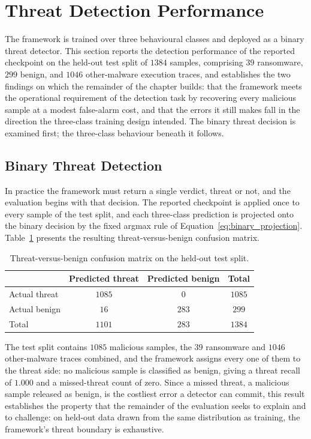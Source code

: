 \documentclass[%
    BCOR=10mm,
    DIV=13,
    toc=bibliography,
    toc=listof,
    oneside,
    12pt,
]{scrbook}
\begin{document}
\section{Threat Detection Performance}
\label{sec:main_results}

The framework is trained over three behavioural classes and deployed as a binary
threat detector. This section reports the detection performance of the reported
checkpoint on the held-out test split of $1384$ samples, comprising $39$
ransomware, $299$ benign, and $1046$ other-malware execution traces, and
establishes the two findings on which the remainder of the chapter builds: that
the framework meets the operational requirement of the detection task by
recovering every malicious sample at a modest false-alarm cost, and that the
errors it still makes fall in the direction the three-class training design
intended. The binary threat decision is examined first; the three-class
behaviour beneath it follows.

\subsection{Binary Threat Detection}
\label{subsec:binary_detection}

In practice the framework must return a single verdict, threat or not, and the
evaluation begins with that decision. The reported
checkpoint is applied once to every sample of the test split, and each
three-class prediction is projected onto the binary decision by the fixed
argmax rule of Equation~\ref{eq:binary_projection}.
Table~\ref{tab:binary_confusion} presents the resulting
threat-versus-benign confusion matrix.

\begin{table}[H]
\centering
\small
\caption{Threat-versus-benign confusion matrix on the held-out test split.}
\label{tab:binary_confusion}
\begin{tabular}{l cc c}
\toprule
 & \textbf{Predicted threat} & \textbf{Predicted benign} & \textbf{Total} \\
\midrule
Actual threat & $1085$ & $0$   & $1085$ \\
Actual benign & $16$   & $283$ & $299$  \\
\midrule
Total         & $1101$ & $283$ & $1384$ \\
\bottomrule
\end{tabular}
\end{table}

The test split contains $1085$ malicious
samples, the $39$ ransomware and $1046$ other-malware traces combined, and
the framework assigns every one of them to the threat side: no malicious sample
is classified as benign, giving a threat recall of $1.000$ and a missed-threat
count of zero. Since a missed threat, a malicious sample released as benign, is
the costliest error a detector can commit, this result establishes the property
that the remainder of the evaluation seeks to explain and to challenge: on
held-out data drawn from the same distribution as training, the framework's
threat boundary is exhaustive.
\end{document}
